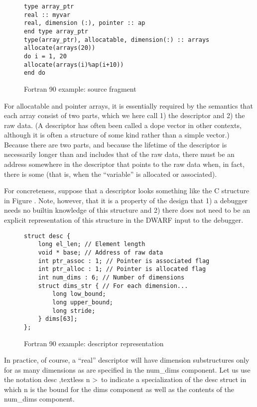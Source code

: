 \begin{figure}[here]
\begin{lstlisting}
type array_ptr
real :: myvar
real, dimension (:), pointer :: ap
end type array_ptr
type(array_ptr), allocatable, dimension(:) :: arrays
allocate(arrays(20))
do i = 1, 20
allocate(arrays(i)%ap(i+10))
end do
\end{lstlisting}
\caption{Fortran 90 example: source fragment} \label{fig:fortran90examplesourcefragment}
\end{figure}

For allocatable and pointer arrays, it is essentially required
by the  semantics that each array consist of 
two
parts, which we here call 1) the descriptor and 2) the raw
data. (A descriptor has often been called a dope vector in
other contexts, although it is often a structure of some kind
rather than a simple vector.) Because there are two parts,
and because the lifetime of the descriptor is necessarily
longer than and includes that of the raw data, there must be
an address somewhere in the descriptor that points to the
raw data when, in fact, there is some (that is, when 
the ``variable'' is allocated or associated).

For concreteness, suppose that a descriptor looks something
like the C structure in 
Figure .
Note, however, that it is
a property of the design that 1) a debugger needs no builtin
knowledge of this structure and 2) there does not need to
be an explicit representation of this structure in the DWARF
input to the 
debugger.

\begin{figure}[here]
\begin{lstlisting}
struct desc {
    long el_len; // Element length
    void * base; // Address of raw data
    int ptr_assoc : 1; // Pointer is associated flag
    int ptr_alloc : 1; // Pointer is allocated flag
    int num_dims : 6; // Number of dimensions
    struct dims_str { // For each dimension...  
        long low_bound;
        long upper_bound;
        long stride;
    } dims[63];
};
\end{lstlisting}
\caption{Fortran 90 example: descriptor representation} \label{fig:fortran90exampledescriptorrepresentation}
\end{figure}


In practice, of course, a “real” descriptor will have
dimension substructures only for as many dimensions as are
specified in the num\_dims component. Let us use the notation
desc ,textless n \textgreater\   
to indicate a specialization of the desc struct in
which n is the bound for the dims component as well as the
contents of the num\_dims component.

